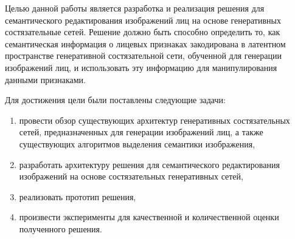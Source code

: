 Целью данной работы является разработка и реализация решения для семантического редактирования изображений лиц на основе генеративных состязательные сетей. 
Решение должно быть способно определить то, как семантическая информация о лицевых признаках закодирована в латентном пространстве генеративной состязательной сети, обученной для генерации изображений лиц, и использовать эту информацию для манипулирования данными признаками.

Для достижения цели были поставлены следующие задачи:

\begin{enumerate}
\item провести обзор существующих архитектур генеративных состязательных сетей, предназначенных для генерации изображений лиц, а также существующих алгоритмов выделения семантики изображения,
\item разработать архитектуру решения для семантического редактирования изображений  на основе состязательных генеративных сетей,
\item реализовать прототип решения,
\item произвести эксперименты для качественной и количественной оценки полученного решения.
\end{enumerate}

